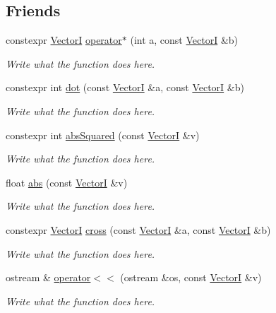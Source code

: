 \subsection*{Friends}
\begin{DoxyCompactItemize}
\item 
constexpr \hyperlink{structVectorI}{Vector\+I} \hyperlink{structVectorI_a8ca1871ee915261bf5f209bf34845352}{operator$\ast$} (int a, const \hyperlink{structVectorI}{Vector\+I} \&b)
\begin{DoxyCompactList}\small\item\em Write what the function does here. \end{DoxyCompactList}\item 
constexpr int \hyperlink{structVectorI_a10071232f1e09cba9bc0d5cd6f1682e1}{dot} (const \hyperlink{structVectorI}{Vector\+I} \&a, const \hyperlink{structVectorI}{Vector\+I} \&b)
\begin{DoxyCompactList}\small\item\em Write what the function does here. \end{DoxyCompactList}\item 
constexpr int \hyperlink{structVectorI_aad5ba75ce5b6abf929b2d0ae10cb20ba}{abs\+Squared} (const \hyperlink{structVectorI}{Vector\+I} \&v)
\begin{DoxyCompactList}\small\item\em Write what the function does here. \end{DoxyCompactList}\item 
float \hyperlink{structVectorI_a51fa10de94ee70191edbc9d465d4ccc3}{abs} (const \hyperlink{structVectorI}{Vector\+I} \&v)
\begin{DoxyCompactList}\small\item\em Write what the function does here. \end{DoxyCompactList}\item 
constexpr \hyperlink{structVectorI}{Vector\+I} \hyperlink{structVectorI_a0f0203ee67ee2450caf3f94e13e9af53}{cross} (const \hyperlink{structVectorI}{Vector\+I} \&a, const \hyperlink{structVectorI}{Vector\+I} \&b)
\begin{DoxyCompactList}\small\item\em Write what the function does here. \end{DoxyCompactList}\item 
ostream \& \hyperlink{structVectorI_a81aa51f3c6f388abff6e689bd5f64d94}{operator$<$$<$} (ostream \&os, const \hyperlink{structVectorI}{Vector\+I} \&v)
\begin{DoxyCompactList}\small\item\em Write what the function does here. \end{DoxyCompactList}\end{DoxyCompactItemize}


